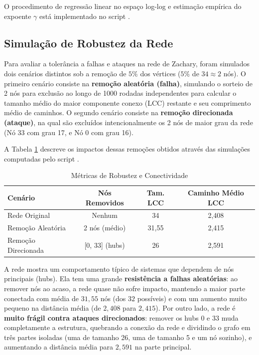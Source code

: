 \documentclass[sigconf,nonacm]{webmedia}
\begin{document}
O procedimento de regressão linear no espaço log-log e estimação empírica do expoente $\gamma$ está implementado no script .

\subsection{Simulação de Robustez da Rede}
\label{subsec:robustness}

Para avaliar a tolerância a falhas e ataques na rede de Zachary, foram simulados dois cenários distintos sob a remoção de $5\%$ dos vértices ($5\%$ de $34 \approx 2$ nós). O primeiro cenário consiste na \textbf{remoção aleatória (falha)}, simulando o sorteio de 2 nós para exclusão ao longo de 1000 rodadas independentes para calcular o tamanho médio do maior componente conexo (LCC) restante e seu comprimento médio de caminhos. O segundo cenário consiste na \textbf{remoção direcionada (ataque)}, na qual são excluídos intencionalmente os 2 nós de maior grau da rede (Nó 33 com grau 17, e Nó 0 com grau 16).

A Tabela \ref{tab:robustness} descreve os impactos dessas remoções obtidos através das simulações computadas pelo script .

\begin{table}[htbp]
  \caption{Métricas de Robustez e Conectividade}
  \label{tab:robustness}
  \centering
  \footnotesize
  \begin{tabular}{lccc}
    \toprule
    Cenário & Nós Removidos & Tam. LCC & Caminho Médio LCC \\
    \midrule
    Rede Original & Nenhum & 34 & 2,408 \\
    Remoção Aleatória & 2 nós (médio) & 31,55 & 2,415 \\
    Remoção Direcionada & [0, 33] (hubs) & 26 & 2,591 \\
    \bottomrule
  \end{tabular}
\end{table}

A rede mostra um comportamento típico de sistemas que dependem de nós principais (hubs). Ela tem uma grande \textbf{resistência a falhas aleatórias}: ao remover nós ao acaso, a rede quase não sofre impacto, mantendo a maior parte conectada com média de $31,55$ nós (dos $32$ possíveis) e com um aumento muito pequeno na distância média (de $2,408$ para $2,415$). Por outro lado, a rede é \textbf{muito frágil contra ataques direcionados}: remover os hubs 0 e 33 muda completamente a estrutura, quebrando a conexão da rede e dividindo o grafo em três partes isoladas (uma de tamanho 26, uma de tamanho 5 e um nó sozinho), e aumentando a distância média para $2,591$ na parte principal.
\end{document}
